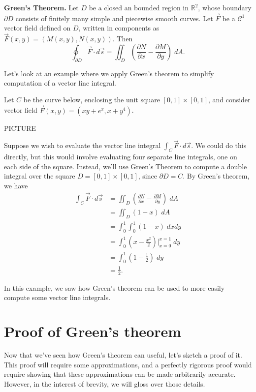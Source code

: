 \documentclass{ximera}
\begin{document}
\begin{theorem}
\textbf{Green's Theorem.} Let $D$ be a closed an bounded region in $\mathbb{R}^2$, whose boundary $\partial D$ consists of finitely many simple and piecewise smooth curves. Let $\vec{F}$ be a $\mathcal{C}^1$ vector field defined on $D$, written in components as $\vec{F}(x,y) = (M(x,y), N(x,y))$. Then
\[
\oint_{\partial D}\vec{F}\cdot d\vec{s} = \iint_D \left(\frac{\partial N}{\partial x} - \frac{\partial M}{\partial y}\right)\;dA.
\]
\end{theorem}

Let's look at an example where we apply Green's theorem to simplify computation of a vector line integral.

\begin{example}
Let $C$ be the curve below, enclosing the unit square $[0,1]\times [0,1]$, and consider vector field $\vec{F}(x,y)= (xy + e^x, x+y^4)$.

PICTURE

Suppose we wish to evaluate the vector line integral $\int_C\vec{F}\cdot d\vec{s}$. We could do this directly, but this would involve evaluating four separate line integrals, one on each side of the square. Instead, we'll use Green's Theorem to compute a double integral over the square $D = [0,1]\times [0,1]$, since $\partial D = C$. By Green's theorem, we have
\begin{align*}
\int_C\vec{F}\cdot d\vec{s} &= \iint_D \left(\frac{\partial N}{\partial x} - \frac{\partial M}{\partial y}\right)\;dA\\
&= \iint_D\left(1 - x\right)\;dA\\
&= \int_0^1\int_0^1(1-x)\;dxdy\\
&= \int_0^1 \left(x - \frac{x^2}{2}\right)|_{x=0}^{x=1}\;dy\\
&= \int_0^1\left(1 - \frac{1}{2}\right)\;dy\\
&= \frac{1}{2}.
\end{align*}

In this example, we saw how Green's theorem can be used to more easily compute some vector line integrals.
\end{example}

\section*{Proof of Green's theorem}

Now that we've seen how Green's theorem can useful, let's sketch a proof of it. This proof will require some approximations, and a perfectly rigorous proof would require showing that these approximations can be made arbitrarily accurate. However, in the interest of brevity, we will gloss over those details.
\end{document}
